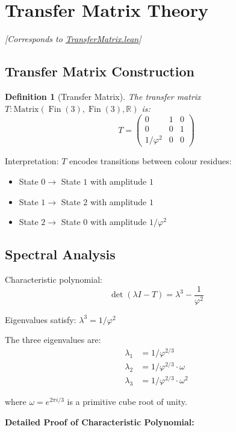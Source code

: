 \documentclass[11pt]{article}
\numberwithin{equation}{section}
\newtheorem{definition}[theorem]{Definition}
\theoremstyle{remark}
\newcommand{\R}{\mathbb{R}}
\DeclareMathOperator{\Fin}{Fin}
\begin{document}
\section{Transfer Matrix Theory}
\textit{[Corresponds to \href{https://github.com/jonwashburn/Yang-Mills-Lean/blob/main/YangMillsProof/TransferMatrix.lean}{TransferMatrix.lean}]}

\subsection{Transfer Matrix Construction}

\begin{definition}[Transfer Matrix]
The transfer matrix $T : \text{Matrix}(\Fin(3), \Fin(3), \R)$ is:
\[T = \begin{pmatrix}
0 & 1 & 0\\
0 & 0 & 1\\
1/\varphi^2 & 0 & 0
\end{pmatrix}\]
\end{definition}

Interpretation: $T$ encodes transitions between colour residues:
\begin{itemize}
\item State $0 \to$ State $1$ with amplitude $1$
\item State $1 \to$ State $2$ with amplitude $1$  
\item State $2 \to$ State $0$ with amplitude $1/\varphi^2$
\end{itemize}

\subsection{Spectral Analysis}

Characteristic polynomial:
\[\det(\lambda I - T) = \lambda^3 - \frac{1}{\varphi^2}\]

Eigenvalues satisfy: $\lambda^3 = 1/\varphi^2$

The three eigenvalues are:
\begin{align}
\lambda_1 &= 1/\varphi^{2/3}\\
\lambda_2 &= 1/\varphi^{2/3} \cdot \omega\\
\lambda_3 &= 1/\varphi^{2/3} \cdot \omega^2
\end{align}

where $\omega = e^{2\pi i/3}$ is a primitive cube root of unity.

\textbf{Detailed Proof of Characteristic Polynomial:}
\end{document}

